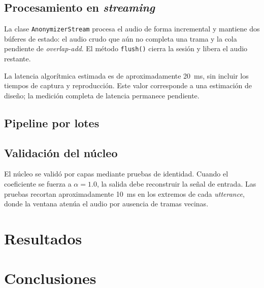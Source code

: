 \documentclass[10pt,twocolumn]{article}
\begin{document}
\subsection{Procesamiento en \textit{streaming}}

La clase \texttt{AnonymizerStream} procesa el audio de forma incremental y
mantiene dos búferes de estado: el audio crudo que aún no completa una trama y
la cola pendiente de \textit{overlap-add}. El método \texttt{flush()} cierra la
sesión y libera el audio restante.

La latencia algorítmica estimada es de aproximadamente 20~ms, sin incluir los
tiempos de captura y reproducción. Este valor corresponde a una estimación de
diseño; la medición completa de latencia permanece pendiente.

\subsection{Pipeline por lotes}


\subsection{Validación del núcleo}

El núcleo se validó por capas mediante pruebas de identidad. Cuando el
coeficiente se fuerza a $\alpha=1.0$, la salida debe reconstruir la señal de
entrada. Las pruebas recortan aproximadamente 10~ms en los extremos de cada
\textit{utterance}, donde la ventana atenúa el audio por ausencia de tramas
vecinas.


\section{Resultados}




\section{Conclusiones}
\end{document}
